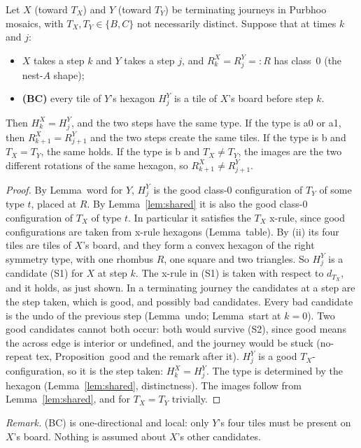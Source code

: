 \documentclass[11pt]{article}
\theoremstyle{definition}\newtheorem{definition}[theorem]{Definition}\newtheorem{remark}[theorem]{Remark}
\begin{document}
\begin{lemma}\label{lem:lock}
Let $X$ (toward $T_X$) and $Y$ (toward $T_Y$) be terminating journeys in Purbhoo mosaics, with $T_X,T_Y\in\{B,C\}$ not necessarily distinct. Suppose that at times $k$ and $j$:
\begin{itemize}
\item[(i)] $X$ takes a step $k$ and $Y$ takes a step $j$, and $R^X_k=R^Y_j=:R$ has class~$0$ (the nest-$A$ shape);
\item[(ii)] \textbf{(BC)} every tile of $Y$'s hexagon $H^Y_j$ is a tile of $X$'s board before step $k$.
\end{itemize}
Then $H^X_k=H^Y_j$, and the two steps have the same type. If the type is a0 or a1, then $R^X_{k+1}=R^Y_{j+1}$ and the two steps create the same tiles. If the type is b and $T_X=T_Y$, the same holds. If the type is b and $T_X\ne T_Y$, the images are the two different rotations of the same hexagon, so $R^X_{k+1}\ne R^Y_{j+1}$.
\end{lemma}
\begin{proof}
By Lemma~word for $Y$, $H^Y_j$ is the good class-$0$ configuration of $T_Y$ of some type $t$, placed at $R$. By Lemma~\ref{lem:shared} it is also the good class-$0$ configuration of $T_X$ of type $t$. In particular it satisfies the $T_X$ x-rule, since good configurations are taken from x-rule hexagons (Lemma~table).
By (ii) its four tiles are tiles of $X$'s board, and they form a convex hexagon of the right symmetry type, with one rhombus $R$, one square and two triangles. So $H^Y_j$ is a candidate (S1) for $X$ at step $k$. The x-rule in (S1) is taken with respect to $d_{T_X}$, and it holds, as just shown.
In a terminating journey the candidates at a step are the step taken, which is good, and possibly bad candidates. Every bad candidate is the undo of the previous step (Lemma~undo; Lemma~start at $k=0$). Two good candidates cannot both occur: both would survive (S2), since good means the across edge is interior or undefined, and the journey would be stuck (no-repeat tex, Proposition~good and the remark after it).
$H^Y_j$ is a good $T_X$-configuration, so it is the step taken: $H^X_k=H^Y_j$.
The type is determined by the hexagon (Lemma~\ref{lem:shared}, distinctness). The images follow from Lemma~\ref{lem:shared}, and for $T_X=T_Y$ trivially.
\end{proof}
\noindent\emph{Remark.} (BC) is one-directional and local: only $Y$'s four tiles must be present on $X$'s board. Nothing is assumed about $X$'s other candidates.
\end{document}
